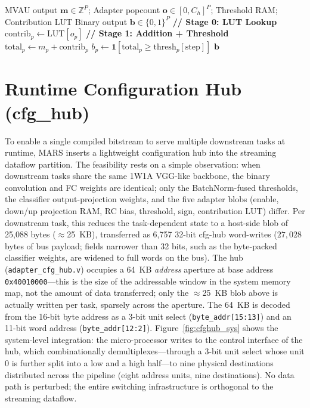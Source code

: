 \documentclass[12pt, a4paper]{report}
\numberwithin{equation}{chapter}
\numberwithin{figure}{chapter}
\numberwithin{table}{chapter}
\numberwithin{algorithm}{chapter}
\begin{document}
\begin{algorithm}[htbp]
\caption{Stream Adder + Threshold Fusion}
\label{alg:adder_threshold}
\begin{algorithmic}[1]
\Require MVAU output $\mathbf{m} \in \mathbb{Z}^P$; Adapter popcount $\mathbf{o} \in [0, C_h]^P$; Threshold RAM; Contribution LUT
\Ensure Binary output $\mathbf{b} \in \{0,1\}^P$
\State \textbf{// Stage 0: LUT Lookup}
    \State $\text{contrib}_p \gets \text{LUT}[o_p]$ 
\EndFor
\State \textbf{// Stage 1: Addition + Threshold}
    \State $\text{total}_p \gets m_p + \text{contrib}_p$
    \State $b_p \gets \mathbf{1}[\text{total}_p \geq \text{thresh}_p[\text{step}]]$
\EndFor
\State \Return $\mathbf{b}$
\end{algorithmic}
\end{algorithm}

\section{Runtime Configuration Hub (\texorpdfstring{cfg\_hub}{cfg\_hub})}
\label{sec:cfg_hub_hw}

To enable a single compiled bitstream to serve multiple downstream tasks at runtime, MARS inserts a lightweight configuration hub into the streaming dataflow partition. The feasibility rests on a simple observation: when downstream tasks share the same 1W1A VGG-like backbone, the binary convolution and FC weights are identical; only the BatchNorm-fused thresholds, the classifier output-projection weights, and the five adapter blobs (enable, down/up projection RAM, RC bias, threshold, sign, contribution LUT) differ. Per downstream task, this reduces the task-dependent state to a host-side blob of 25{,}088 bytes ($\approx$25~KB), transferred as 6{,}757 32-bit cfg-hub word-writes ($27{,}028$ bytes of bus payload; fields narrower than 32 bits, such as the byte-packed classifier weights, are widened to full words on the bus). The hub (\texttt{adapter\_cfg\_hub.v}) occupies a 64~KB \emph{address} aperture at base address \texttt{0x40010000}---this is the size of the addressable window in the system memory map, not the amount of data transferred; only the $\approx$25~KB blob above is actually written per task, sparsely across the aperture. The 64~KB is decoded from the 16-bit byte address as a 3-bit unit select (\texttt{byte\_addr[15:13]}) and an 11-bit word address (\texttt{byte\_addr[12:2]}). Figure~\ref{fig:cfghub_sys} shows the system-level integration: the micro-processor writes to the control interface of the hub, which combinationally demultiplexes---through a 3-bit unit select whose unit 0 is further split into a low and a high half---to nine physical destinations distributed across the pipeline (eight address units, nine destinations). No data path is perturbed; the entire switching infrastructure is orthogonal to the streaming dataflow.
\end{document}
